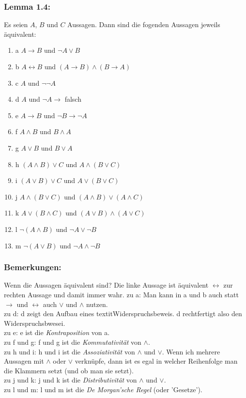 \documentclass{article}
\begin{document}

\subsubsection*{Lemma 1.4:}
Es seien $A$, $B$ und $C$ Aussagen. Dann sind die fogenden Aussagen jeweils äquivalent: \\
\begin{enumerate}
    \item a $A \rightarrow B$ und $\neg A \vee B$
    \item b $A \leftrightarrow B$ und $(A \rightarrow B) \wedge (B \rightarrow A)$
    \item c $A$ und $\neg \neg A$
    \item d $A$ und $\neg A \rightarrow $ falsch
    \item e $A \rightarrow B$ und $\neg B \rightarrow \neg A$
    \item f $A \wedge B$ und $B \wedge A$
    \item g $A \vee B$ und $B \vee A$
    \item h $(A \wedge B) \vee C$ und $A \wedge (B \vee C)$
    \item i $(A \vee B) \vee C$ und $A \vee (B \vee C)$
    \item j $A \wedge (B \vee C)$ und $(A \wedge B) \vee (A \wedge C)$
    \item k $A \vee (B \wedge C)$ und $(A \vee B) \wedge (A \vee C)$
    \item l $\neg (A \wedge B)$ und $\neg A \vee \neg B$
    \item m $\neg (A \vee B)$ und $\neg A \wedge \neg B$
\end{enumerate}

\subsubsection*{Bemerkungen:}
Wenn die Aussagen äquivalent sind? Die linke Aussage ist äquivalent $\leftrightarrow$ zur rechten Aussage und damit immer wahr. 
zu a: Man kann in a und b auch statt $\rightarrow$ und $\leftrightarrow$ auch $\vee$ und $\wedge$ nutzen. \\
zu d: d zeigt den Aufbau eines textit{Widerspruchsbeweis}. d rechtfertigt also den Widerspruchsbwesei. \\
zu e: e ist die \textit{Kontraposition} von a. \\
zu f und g: f und g ist die \textit{Kommutativität} von $\wedge$. \\
zu h und i: h und i ist die \textit{Assoziativität} von $\wedge$ und $\vee$. Wenn ich mehrere Aussagen mit $\wedge$ oder $\vee$ verknüpfe, dann ist es egal in welcher Reihenfolge man die Klammern setzt (und ob man sie setzt). \\
zu j und k: j und k ist die \textit{Distributivität} von $\wedge$ und $\vee$. \\
zu l und m: l und m ist die \textit{De Morgan'sche Regel} (oder 'Gesetze'). \\
\end{document}
